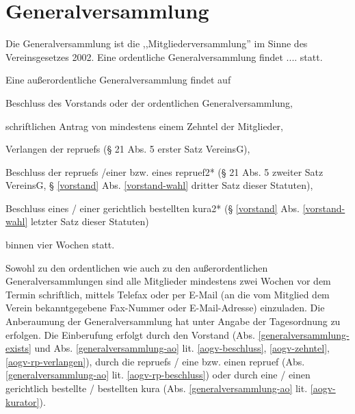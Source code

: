 \documentclass{article}
\begin{document}
\section{Generalversammlung}\label{generalversammlung}
\begin{absatz}
    \item \label{generalversammlung-exists} Die Generalversammlung ist die ,,Mitgliederversammlung'' im Sinne des Vereinsgesetzes 2002. Eine ordentliche Generalversammlung findet
    ....  statt.
    \item \label{generalversammlung-ao} Eine außerordentliche Generalversammlung findet auf
    \begin{littera}
        \item \label{aogv-beschluss} Beschluss des Vorstands oder der ordentlichen Generalversammlung,
        \item \label{aogv-zehntel} schriftlichen Antrag von mindestens einem Zehntel der Mitglieder,
        \item \label{aogv-rp-verlangen} Verlangen der \glspl{repruef} (§ 21 Abs. 5 erster Satz VereinsG),
        \item \label{aogv-rp-beschluss} Beschluss der \glspl{repruef} /einer bzw. eines \gls{repruef2*} (§ 21 Abs. 5 zweiter Satz VereinsG, § \ref{vorstand} Abs. \ref{vorstand-wahl} dritter Satz dieser Statuten),
        \item \label{aogv-kurator} Beschluss eines / einer gerichtlich bestellten \gls{kura2*} (§ \ref{vorstand} Abs. \ref{vorstand-wahl} letzter Satz dieser Statuten)
    \end{littera}
    binnen vier Wochen statt.
    \item Sowohl zu den ordentlichen wie auch zu den außerordentlichen Generalversammlungen sind alle Mitglieder mindestens zwei Wochen vor dem Termin schriftlich, mittels Telefax oder per E-Mail (an die vom Mitglied dem Verein bekanntgegebene Fax-Nummer oder E-Mail-Adresse) einzuladen. Die Anberaumung der Generalversammlung hat unter Angabe der Tagesordnung zu erfolgen. Die Einberufung erfolgt durch den Vorstand (Abs. \ref{generalversammlung-exists} und Abs. \ref{generalversammlung-ao} lit. \ref{aogv-beschluss}, \ref{aogv-zehntel}, \ref{aogv-rp-verlangen}), durch die \glspl{repruef} / eine bzw. einen \gls{repruef} (Abs. \ref{generalversammlung-ao} lit. \ref{aogv-rp-beschluss}) oder durch eine / einen gerichtlich bestellte / bestellten \gls{kura} (Abs. \ref{generalversammlung-ao} lit. \ref{aogv-kurator}).

\end{absatz}
\end{document}
